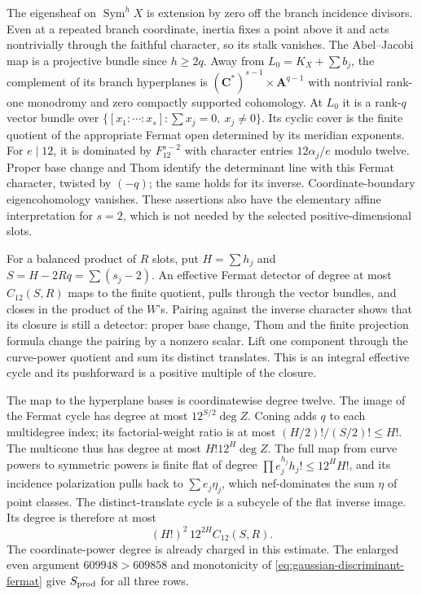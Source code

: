 \documentclass[11pt]{article}
\theoremstyle{definition}
\theoremstyle{remark}
\begin{document}
The eigensheaf on $\operatorname{Sym}^hX$ is extension by zero off
the branch incidence divisors.  Even at a repeated branch coordinate,
inertia fixes a point above it and acts nontrivially through the
faithful character, so its stalk vanishes.
The Abel--Jacobi map is a projective bundle since $h\ge2q$.
Away from $L_0=K_X+\sum b_j$, the complement of its branch
hyperplanes is $(\mathbf C^*)^{s-1}\times\mathbf A^{q-1}$ with
nontrivial rank-one monodromy and zero compactly supported cohomology.
At $L_0$ it is a rank-$q$ vector bundle over
$\{[x_1:\cdots:x_s]:\sum x_j=0,\ x_j\ne0\}$.
Its cyclic cover is the finite quotient of the appropriate Fermat
open determined by its meridian exponents.
For $e\mid12$, it is dominated by $F_{12}^{s-2}$ with character
entries $12\alpha_j/e$ modulo twelve.
Proper base change and Thom identify the determinant line with this
Fermat character, twisted by $(-q)$; the same holds for its inverse.
Coordinate-boundary eigencohomology vanishes.
These assertions also have the elementary affine interpretation for
$s=2$, which is not needed by the selected positive-dimensional slots.

For a balanced product of $R$ slots, put $H=\sum h_j$ and
$S=H-2Rq=\sum(s_j-2)$.
An effective Fermat detector of degree at most $C_{12}(S,R)$ maps to
the finite quotient, pulls through the vector bundles, and closes in
the product of the $W$'s.  Pairing against the inverse character shows
that its closure is still a detector: proper base change, Thom and
the finite projection formula change the pairing by a nonzero scalar.
Lift one component through the curve-power quotient and sum its
distinct translates.  This is an integral effective cycle and its
pushforward is a positive multiple of the closure.

The map to the hyperplane bases is coordinatewise degree twelve.
The image of the Fermat cycle has degree at most $12^{S/2}\deg Z$.
Coning adds $q$ to each multidegree index; its factorial-weight ratio
is at most $(H/2)!/(S/2)!\le H!$.
The multicone thus has degree at most $H!12^H\deg Z$.
The full map from curve powers to symmetric powers is finite flat of
degree $\prod e_j^{h_j}h_j!\le12^HH!$, and its incidence polarization
pulls back to $\sum e_j\eta_j$, which nef-dominates the sum $\eta$ of
point classes.  The distinct-translate cycle is a subcycle of the
flat inverse image.  Its degree is therefore at most
\[
                         (H!)^2\,12^{2H}C_{12}(S,R).
\]
The coordinate-power degree is already charged in this estimate.
The enlarged even argument $609948>609858$ and monotonicity of
\eqref{eq:gaussian-discriminant-fermat} give $S_{\rm prod}$ for all three rows.
\end{document}
